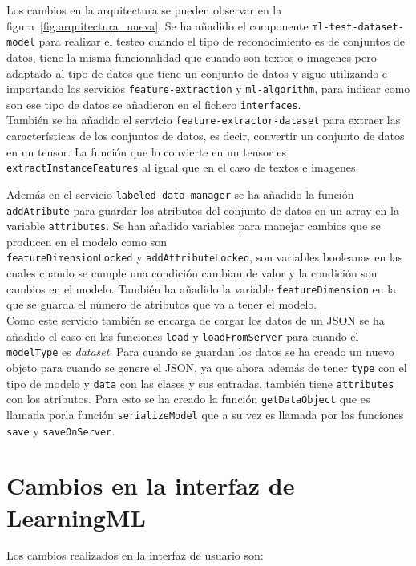 \documentclass[a4paper, 12pt]{book}
\begin{document}
Los cambios en la arquitectura se pueden observar en la figura~\ref{fig:arquitectura_nueva}. 
Se ha añadido el componente \texttt{ml-test-dataset-model} para realizar el testeo cuando el tipo de reconocimiento es de conjuntos de datos, tiene la misma funcionalidad que cuando son textos o imagenes pero adaptado al tipo de datos que tiene un conjunto de datos y sigue utilizando e importando los servicios \texttt{feature-extraction} y \texttt{ml-algorithm}, para indicar como son ese tipo de datos se añadieron en el fichero \texttt{interfaces}. \\
También se ha añadido el servicio \texttt{feature-extractor-dataset} para extraer las características de los conjuntos de datos, es decir, convertir un conjunto de datos en un tensor. 
La función que lo convierte en un tensor es \texttt{extractInstanceFeatures} al igual que en el caso de textos e imagenes.

Además en el servicio \texttt{labeled-data-manager} se ha añadido la función \texttt{addAtribute} para guardar los atributos del conjunto de datos en un array en la variable \texttt{attributes}. 
Se han añadido variables para manejar cambios que se producen en el modelo como son \\ \texttt{featureDimensionLocked} y \texttt{addAttributeLocked}, son variables booleanas en las cuales cuando se cumple una condición cambian de valor y la condición son cambios en el modelo. 
También ha añadido la variable \texttt{featureDimension} en la que se guarda el número de atributos que va a tener el modelo. \\
Como este servicio también se encarga de cargar los datos de un JSON se ha añadido el caso en las funciones \texttt{load} y \texttt{loadFromServer} para cuando el \texttt{modelType} es \emph{dataset}. 
Para cuando se guardan los datos se ha creado un nuevo objeto para cuando se genere el JSON, ya que ahora además de tener \texttt{type} con el tipo de modelo y \texttt{data} con las clases y sus entradas, también tiene \texttt{attributes} con los atributos. 
Para esto se ha creado la función \texttt{getDataObject} que es llamada porla función \texttt{serializeModel} que a su vez es llamada por las funciones \texttt{save} y \texttt{saveOnServer}.


\section{Cambios en la interfaz de LearningML} 
\label{sec:interfaz}

Los cambios realizados en la interfaz de usuario son:
\end{document}
